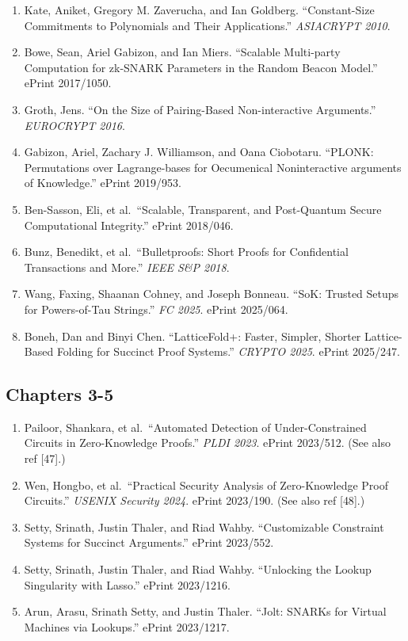 \documentclass[
  11pt,
  openany]{report}
\providecommand{\tightlist}{%
  \setlength{\itemsep}{0pt}\setlength{\parskip}{0pt}}
\begin{document}
\begin{enumerate}
\def\labelenumi{\arabic{enumi}.}
\setcounter{enumi}{3}
\tightlist
\item
  Kate, Aniket, Gregory M. Zaverucha, and Ian Goldberg. ``Constant-Size
  Commitments to Polynomials and Their Applications.'' \emph{ASIACRYPT 2010}.
\item
  Bowe, Sean, Ariel Gabizon, and Ian Miers. ``Scalable Multi-party Computation
  for zk-SNARK Parameters in the Random Beacon Model.'' ePrint 2017/1050.
\item
  Groth, Jens. ``On the Size of Pairing-Based Non-interactive Arguments.''
  \emph{EUROCRYPT 2016}.
\item
  Gabizon, Ariel, Zachary J. Williamson, and Oana Ciobotaru. ``PLONK:
  Permutations over Lagrange-bases for Oecumenical Noninteractive arguments of
  Knowledge.'' ePrint 2019/953.
\item
  Ben-Sasson, Eli, et al.~``Scalable, Transparent, and Post-Quantum Secure
  Computational Integrity.'' ePrint 2018/046.
\item
  Bunz, Benedikt, et al.~``Bulletproofs: Short Proofs for Confidential
  Transactions and More.'' \emph{IEEE S\&P 2018}.
\item
  Wang, Faxing, Shaanan Cohney, and Joseph Bonneau. ``SoK: Trusted Setups for
  Powers-of-Tau Strings.'' \emph{FC 2025}. ePrint 2025/064.
\item
  Boneh, Dan and Binyi Chen. ``LatticeFold+: Faster, Simpler, Shorter
  Lattice-Based Folding for Succinct Proof Systems.'' \emph{CRYPTO 2025}. ePrint
  2025/247.
\end{enumerate}

\subsection{Chapters 3-5}\label{chapters-3-5}

\begin{enumerate}
\def\labelenumi{\arabic{enumi}.}
\setcounter{enumi}{11}
\tightlist
\item
  Pailoor, Shankara, et al.~``Automated Detection of Under-Constrained Circuits
  in Zero-Knowledge Proofs.'' \emph{PLDI 2023}. ePrint 2023/512. (See also ref
  {[}47{]}.)
\item
  Wen, Hongbo, et al.~``Practical Security Analysis of Zero-Knowledge Proof
  Circuits.'' \emph{USENIX Security 2024}. ePrint 2023/190. (See also ref
  {[}48{]}.)
\item
  Setty, Srinath, Justin Thaler, and Riad Wahby. ``Customizable Constraint
  Systems for Succinct Arguments.'' ePrint 2023/552.
\item
  Setty, Srinath, Justin Thaler, and Riad Wahby. ``Unlocking the Lookup
  Singularity with Lasso.'' ePrint 2023/1216.
\item
  Arun, Arasu, Srinath Setty, and Justin Thaler. ``Jolt: SNARKs for Virtual
  Machines via Lookups.'' ePrint 2023/1217.
\end{enumerate}
\end{document}
